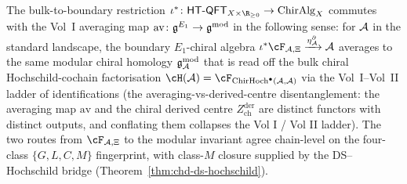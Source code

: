 \begin{remark}
\label{rem:bulk-bdry-vol1-averaging}%
The bulk-to-boundary restriction
$\iota^* \colon \HTQFT_{X \times \R_{\geq 0}} \to
\mathrm{ChirAlg}_X$ commutes with the Vol~I averaging map
$\mathrm{av} \colon \mathfrak{g}^{E_1} \to \mathfrak{g}^{\mathrm{mod}}$ in the
following sense: for $\mathcal{A}$ in the standard landscape, the
boundary $E_1$-chiral algebra
\(\iota^*\cF_{\cA,\Xi}\xrightarrow{\eta^\partial_\cA}\cA\)
averages to the same modular
chiral homology $\mathfrak{g}^{\mathrm{mod}}_{\mathcal{A}}$ that is read off the
bulk chiral Hochschild-cochain factorisation $\cH(\cA) =
\cF_{\ChirHoch^\bullet(\cA,\cA)}$ via the
Vol~I--Vol~II ladder of identifications
(the averaging-vs-derived-centre disentanglement: the averaging
map $\mathrm{av}$ and the chiral derived centre $Z^{\mathrm{der}}_{\mathrm{ch}}$
are distinct functors with distinct outputs, and conflating them
collapses the Vol I / Vol II ladder). The
two routes from \(\cF_{\cA,\Xi}\) to the modular invariant agree
chain-level on the four-class $\{G, L, C, M\}$
fingerprint, with class-$M$ closure supplied by the
DS--Hochschild bridge
(Theorem~\ref*{thm:chd-ds-hochschild}).
\end{remark}

